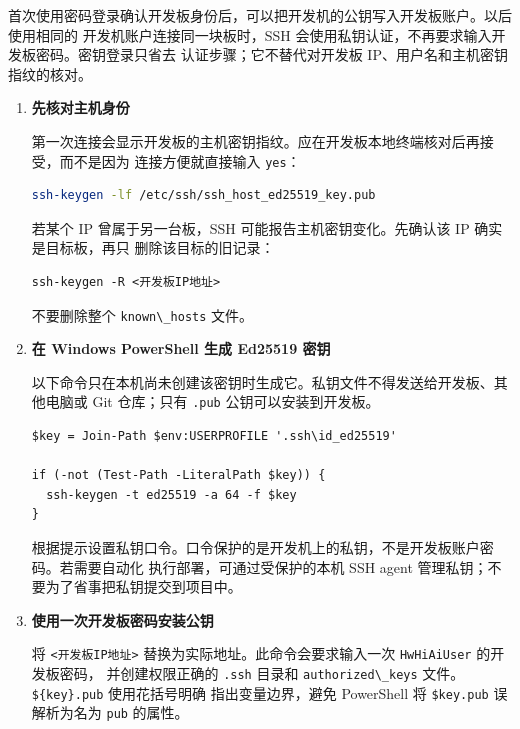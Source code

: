 首次使用密码登录确认开发板身份后，可以把开发机的公钥写入开发板账户。以后使用相同的
开发机账户连接同一块板时，SSH
会使用私钥认证，不再要求输入开发板密码。密钥登录只省去
认证步骤；它不替代对开发板 IP、用户名和主机密钥指纹的核对。

\begin{enumerate}
\def\labelenumi{\arabic{enumi}.}
\item
  \textbf{先核对主机身份}

  第一次连接会显示开发板的主机密钥指纹。应在开发板本地终端核对后再接受，而不是因为
  连接方便就直接输入 \passthrough{\lstinline!yes!}：

\begin{lstlisting}[language=bash]
ssh-keygen -lf /etc/ssh/ssh_host_ed25519_key.pub
\end{lstlisting}

  若某个 IP 曾属于另一台板，SSH 可能报告主机密钥变化。先确认该 IP
  确实是目标板，再只 删除该目标的旧记录：

\begin{lstlisting}
ssh-keygen -R <开发板IP地址>
\end{lstlisting}

  不要删除整个 \passthrough{\lstinline!known\_hosts!} 文件。
\item
  \textbf{在 Windows PowerShell 生成 Ed25519 密钥}

  以下命令只在本机尚未创建该密钥时生成它。私钥文件不得发送给开发板、其他电脑或
  Git 仓库；只有 \passthrough{\lstinline!.pub!} 公钥可以安装到开发板。

\begin{lstlisting}
$key = Join-Path $env:USERPROFILE '.ssh\id_ed25519'

if (-not (Test-Path -LiteralPath $key)) {
  ssh-keygen -t ed25519 -a 64 -f $key
}
\end{lstlisting}

  根据提示设置私钥口令。口令保护的是开发机上的私钥，不是开发板账户密码。若需要自动化
  执行部署，可通过受保护的本机 SSH agent
  管理私钥；不要为了省事把私钥提交到项目中。
\item
  \textbf{使用一次开发板密码安装公钥}

  将 \passthrough{\lstinline!<开发板IP地址>!}
  替换为实际地址。此命令会要求输入一次
  \passthrough{\lstinline!HwHiAiUser!} 的开发板密码， 并创建权限正确的
  \passthrough{\lstinline!.ssh!} 目录和
  \passthrough{\lstinline!authorized\_keys!}
  文件。\passthrough{\lstinline!$\{key\}.pub!} 使用花括号明确
  指出变量边界，避免 PowerShell 将 \passthrough{\lstinline!$key.pub!}
  误解析为名为 \passthrough{\lstinline!pub!} 的属性。


\end{enumerate}
